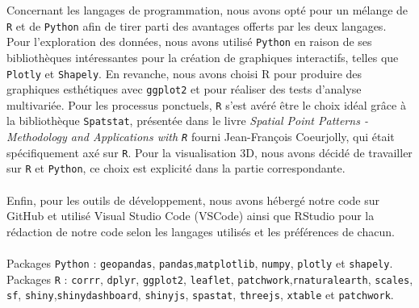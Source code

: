\documentclass[12pt]{article}
\begin{document}
Concernant les langages de programmation, nous avons opté pour un mélange de \texttt{R} et de \texttt{Python} afin de tirer parti des avantages offerts par les deux langages. Pour l'exploration des données, nous avons utilisé \texttt{Python} en raison de ses bibliothèques intéressantes pour la création de graphiques interactifs, telles que \texttt{Plotly} et \texttt{Shapely}. En revanche, nous avons choisi R pour produire des graphiques esthétiques avec \texttt{ggplot2} et pour réaliser des tests d'analyse multivariée. Pour les processus ponctuels, \texttt{R} s'est avéré être le choix idéal grâce à la bibliothèque \texttt{Spatstat},  présentée dans le livre \textit{Spatial Point Patterns - Methodology and Applications with \texttt{R}} \cite{analysing_spacial_points} fourni Jean-François Coeurjolly, qui était spécifiquement axé sur \texttt{R}. Pour la visualisation 3D, nous avons décidé de travailler sur \texttt{R} et \texttt{Python}, ce choix est explicité dans la partie correspondante.\\
\\
Enfin, pour les outils de développement, nous avons hébergé notre code sur GitHub et utilisé Visual Studio Code (VSCode) ainsi que RStudio pour la rédaction de notre code selon les langages utilisés et les préférences de chacun.\\
\\
Packages \texttt{Python} : \texttt{geopandas}, \texttt{pandas},\texttt{matplotlib}, \texttt{numpy}, \texttt{plotly} et \texttt{shapely}.\\
Packages \texttt{R} : \texttt{corrr}, \texttt{dplyr}, \texttt{ggplot2}, \texttt{leaflet}, \texttt{patchwork},\texttt{rnaturalearth}, \texttt{scales}, \texttt{sf}, \texttt{shiny},\texttt{shinydashboard}, \texttt{shinyjs}, \texttt{spastat}, \texttt{threejs}, \texttt{xtable} et 
\texttt{patchwork}.

\newpage
\end{document}

